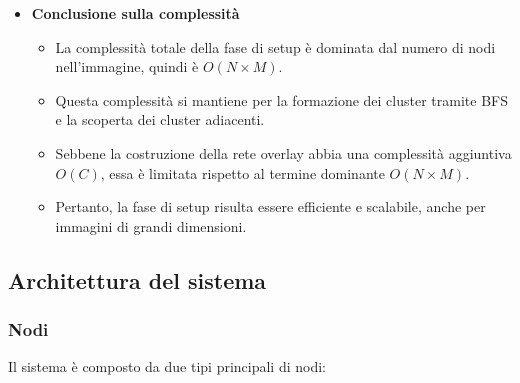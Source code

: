 \documentclass[12pt, a4paper]{report}
\begin{document}
\begin{itemize}
    \item \textbf{Conclusione sulla complessit\`a}
    \begin{itemize}
        \item La complessit\`a totale della fase di setup \`e dominata dal numero di nodi nell'immagine, quindi \`e $O(N \times M)$.
        \item Questa complessit\`a si mantiene per la formazione dei cluster tramite BFS e la scoperta dei cluster adiacenti.
        \item Sebbene la costruzione della rete overlay abbia una complessit\`a aggiuntiva $O(C)$, essa \`e limitata rispetto al termine dominante $O(N \times M)$.
        \item Pertanto, la fase di setup risulta essere efficiente e scalabile, anche per immagini di grandi dimensioni.
    \end{itemize}
\end{itemize}

\subsection{Architettura del sistema}

\subsubsection{Nodi}
Il sistema \`e composto da due tipi principali di nodi:
\end{document}
